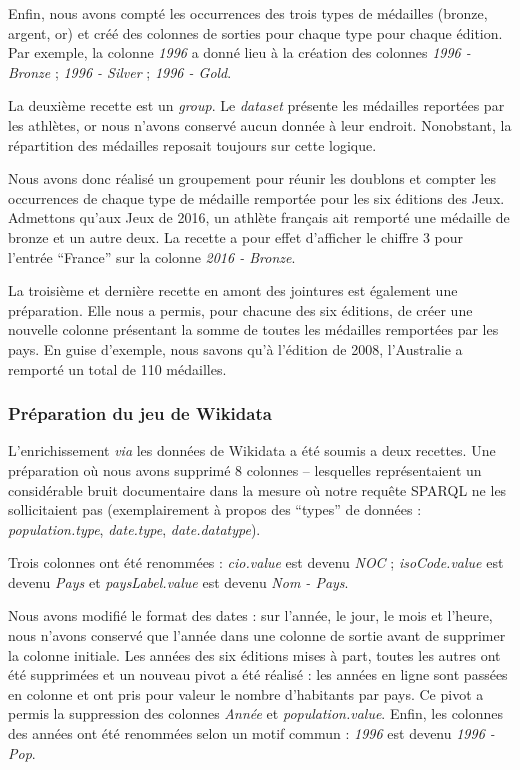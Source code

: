 \documentclass[hidelinks, 12pt]{article}
\begin{document}
Enfin, nous avons compté les occurrences des trois types de médailles (bronze, argent, or) et créé des colonnes de sorties pour chaque type pour chaque édition. Par exemple, la colonne \emph{1996} a donné lieu à la création des colonnes \emph{1996 - Bronze} ; \emph{1996 - Silver} ; \emph{1996 - Gold}.

La deuxième recette est un \emph{group}. Le \emph{dataset} présente les médailles reportées par les athlètes, or nous n'avons conservé aucun donnée à leur endroit. Nonobstant, la répartition des médailles reposait toujours sur cette logique.

Nous avons donc réalisé un groupement pour réunir les doublons et compter les occurrences de chaque type de médaille remportée pour les six éditions des Jeux. Admettons qu'aux Jeux de 2016, un athlète français ait remporté une médaille de bronze et un autre deux. La recette a pour effet d'afficher le chiffre 3 pour l'entrée \enquote{France} sur la colonne \emph{2016 - Bronze}.

La troisième et dernière recette en amont des jointures est également une préparation. Elle nous a permis, pour chacune des six éditions, de créer une nouvelle colonne présentant la somme de toutes les médailles remportées par les pays. En guise d'exemple, nous savons qu'à l'édition de 2008, l'Australie a remporté un total de 110 médailles.

\subsubsection{Préparation du jeu de Wikidata}

L'enrichissement \emph{via} les données de Wikidata a été soumis a deux recettes. Une préparation où nous avons supprimé 8 colonnes -- lesquelles représentaient un considérable bruit documentaire dans la mesure où notre requête SPARQL ne les sollicitaient pas (exemplairement à propos des \enquote{types} de données : \emph{population.type}, \emph{date.type}, \emph{date.datatype}). 

Trois colonnes ont été renommées : \emph{cio.value} est devenu \emph{NOC} ; \emph{isoCode.value} est devenu \emph{Pays} et \emph{paysLabel.value} est devenu \emph{Nom - Pays}.

Nous avons modifié le format des dates : sur l'année, le jour, le mois et l'heure, nous n'avons conservé que l'année dans une colonne de sortie avant de supprimer la colonne initiale. Les années des six éditions mises à part, toutes les autres ont été supprimées et un nouveau pivot a été réalisé : les années en ligne sont passées en colonne et ont pris pour valeur le nombre d'habitants par pays. Ce pivot a permis la suppression des colonnes \emph{Année} et \emph{population.value}. Enfin, les colonnes des années ont été renommées selon un motif commun : \emph{1996} est devenu \emph{1996 - Pop}.
\end{document}

